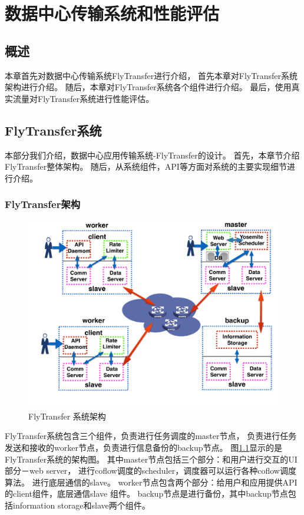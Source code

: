\chapter{数据中心传输系统和性能评估} \label{cha:application-transfer-system}
\section{概述}
本章首先对数据中心传输系统FlyTransfer进行介绍，
首先本章对FlyTransfer系统架构进行介绍。
随后，本章对FlyTransfer系统各个组件进行介绍。
最后，使用真实流量对FlyTransfer系统进行性能评估。
\section{FlyTransfer系统}
本部分我们介绍，数据中心应用传输系统-FlyTransfer的设计。
首先，本章节介绍FlyTransfer整体架构。
随后，从系统组件，API等方面对系统的主要实现细节进行介绍。
\subsection{FlyTransfer架构}
\begin{figure}[b]
\begin{center}
\includegraphics [width=0.8\columnwidth] {figures/Yosemite/figs/system/YosemiteSystem.pdf}
\caption{FlyTransfer 系统架构}
\label{Yosemite-design-fig}
\end{center}
\end{figure}
FlyTransfer系统包含三个组件，负责进行任务调度的master节点，
负责进行任务发送和接收的worker节点，负责进行信息备份的backup节点。
图\ref{Yosemite-design-fig}显示的是FlyTransfer系统的架构图。
其中master节点包括三个部分：和用户进行交互的UI部分－web server，
进行coflow调度的scheduler，调度器可以运行各种coflow调度算法。
进行底层通信的slave。
worker节点包含两个部分：给用户和应用提供API的client组件，底层通信slave 组件。
backup节点是进行备份，其中backup节点包括information storage和slave两个组件。

